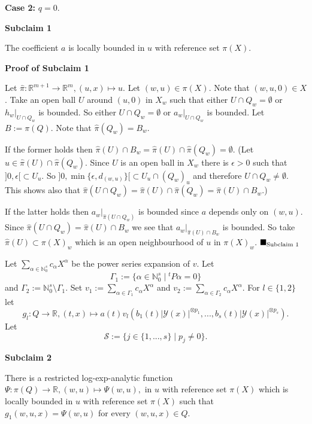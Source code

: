 \documentclass[12pt]{article}
\def\vs{\vspace}
\begin{document}
\vs{0.4cm}
{\bf Case 2:} $q = 0$.

\vs{0.3cm}
{\bf Subclaim 1}

\vs{0.1cm}
The coefficient $a$ is locally bounded in $u$ with reference set $\pi(X)$.

\vs{0.3cm}
{\bf Proof of Subclaim 1}

\vs{0.1cm}
Let $\hat{\pi}:\mathbb{R}^{m+1} \to \mathbb{R}^m, (u,x) \mapsto u$. Let $(w,u) \in \pi(X)$. Note that $(w,u,0) \in X$. Take an open ball $U$ around $(u,0)$ in $X_w$ such that either $U \cap Q_w = \emptyset$ or $h_w|_{U \cap Q_w}$ is bounded. So either $U \cap Q_w = \emptyset$ or $a_w|_{U \cap Q_w}$ is bounded. Let $B:=\pi(Q)$. Note that $\hat{\pi}(Q_w)=B_w$.

\vs{0.1cm}
If the former holds then $\hat{\pi}(U) \cap B_w = \hat{\pi}(U) \cap \hat{\pi}(Q_w) = \emptyset$. (Let $u \in \hat{\pi}(U) \cap \hat{\pi}(Q_w)$. Since $U$ is an open ball in $X_w$ there is $\epsilon>0$ such that $]0,\epsilon[ \subset U_u$. So $]0,\min\{\epsilon,d_{(w,u)}\}[ \subset U_u \cap (Q_w)_u$ and therefore $U \cap Q_w \neq \emptyset$. This shows also that $\hat{\pi}(U \cap Q_w)=\hat{\pi}(U) \cap \hat{\pi}(Q_w)=\hat{\pi}(U) \cap B_w$.)

\vs{0.1cm}
If the latter holds then $a_w|_{\hat{\pi}(U \cap Q_w)}$ is bounded since $a$ depends only on $(w,u)$. Since $\hat{\pi}(U \cap Q_w) = \hat{\pi}(U) \cap B_w$ we see that $a_w|_{\hat{\pi}(U) \cap B_w}$ is bounded. So take $\hat{\pi}(U) \subset \pi(X)_w$ which is an open neighbourhood of $u$ in $\pi(X)_w$. \hfill$\blacksquare_{\textnormal{Subclaim }1}$ 

\vs{0.5cm}
Let $\sum_{\alpha \in \mathbb{N}^s_0} c_{\alpha} X^{\alpha}$ be the power series expansion of $v$. Let 
$$\Gamma_1:=\{\alpha \in \mathbb{N}_0^s \mid {^t}P\alpha = 0\}$$
and
$\Gamma_2:=\mathbb{N}_0^s \setminus \Gamma_1$. Set $v_1:=\sum_{\alpha \in \Gamma_1} c_{\alpha}X^{\alpha}$ and $v_2:=\sum_{\alpha \in \Gamma_2} c_{\alpha}X^{\alpha}$. %
For $l \in \{1,2\}$ let 
$$g_l:Q \to \mathbb{R}, (t,x) \mapsto a(t) v_l(b_1(t)\vert{\mathcal{Y}(x)}\vert^{\otimes p_1},...,b_s(t)\vert{\mathcal{Y}(x)}\vert^{\otimes p_s}).$$
Let 
$$\mathcal{S}:=\{j \in \{1,...,s\} \mid p_j \neq 0\}.$$

\vs{0.3cm}
{\bf Subclaim 2} 

\vs{0.1cm}
There is a restricted log-exp-analytic function $\Psi:\pi(Q) \to \mathbb{R}, (w,u) \mapsto \Psi(w,u),$ in $u$ with reference set $\pi(X)$ which is locally bounded in $u$ with reference set $\pi(X)$ such that $g_1(w,u,x)=\Psi(w,u)$ for every $(w,u,x) \in Q$.
\end{document}
